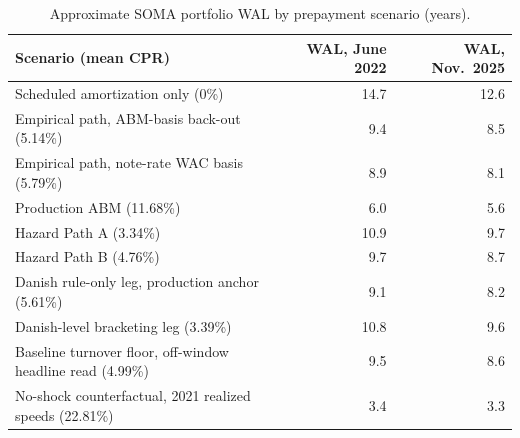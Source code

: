 \documentclass[12pt]{article}
\begin{document}
\begin{table}[H]
\centering
\small
\begin{threeparttable}
\caption{Approximate SOMA portfolio WAL by prepayment scenario (years).}
\label{tab:wal}
\begin{tabular}{@{}lrr@{}}
\toprule
Scenario (mean CPR) & WAL, June 2022 & WAL, Nov.\ 2025 \\
\midrule
Scheduled amortization only (0\%) & 14.7 & 12.6 \\
Empirical path, ABM-basis back-out (5.14\%) & 9.4 & 8.5 \\
Empirical path, note-rate WAC basis (5.79\%) & 8.9 & 8.1 \\
Production ABM (11.68\%) & 6.0 & 5.6 \\
Hazard Path A (3.34\%) & 10.9 & 9.7 \\
Hazard Path B (4.76\%) & 9.7 & 8.7 \\
Danish rule-only leg, production anchor (5.61\%) & 9.1 & 8.2 \\
Danish-level bracketing leg (3.39\%) & 10.8 & 9.6 \\
Baseline turnover floor, off-window headline read (4.99\%) & 9.5 & 8.6 \\
No-shock counterfactual, 2021 realized speeds (22.81\%) & 3.4 & 3.3 \\
\bottomrule
\end{tabular}
\begin{tablenotes}[flushleft]\footnotesize

\end{tablenotes}
\end{threeparttable}
\end{table}
\end{document}
